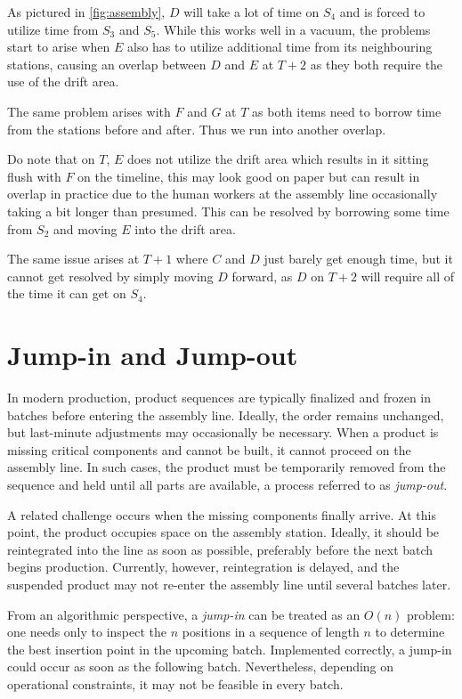 \documentclass[12pt,a4paper]{report}
\begin{document}
As pictured in \autoref{fig:assembly}, $D$ will take a lot of time on $S_4$ and is forced to utilize time from $S_3$ and $S_5$. 
While this works well in a vacuum, the problems start to arise when $E$ also has to utilize additional time from its neighbouring stations, causing an overlap between $D$ and $E$ at $T+2$ as they both require the use of the drift area. 

The same problem arises with $F$ and $G$ at $T$ as both items need to borrow time from the stations before and after. Thus we run into another overlap.

Do note that on $T$, $E$ does not utilize the drift area which results in it sitting flush with $F$ on the timeline, this may look good on paper but can result in overlap in practice due to the human workers at the assembly line occasionally taking a bit longer than presumed. This can be resolved by borrowing some time from $S_2$ and moving $E$ into the drift area. 

The same issue arises at $T+1$ where $C$ and $D$ just barely get enough time, but it cannot get resolved by simply moving $D$ forward, as $D$ on $T+2$ will require all of the time it can get on $S_4$. 

\section{Jump-in and Jump-out}
In modern production, product sequences are typically finalized and frozen in batches before entering the assembly line. Ideally, the order remains unchanged, but last-minute adjustments may occasionally be necessary. When a product is missing critical components and cannot be built, it cannot proceed on the assembly line. In such cases, the product must be temporarily removed from the sequence and held until all parts are available, a process referred to as \emph{jump-out}.

A related challenge occurs when the missing components finally arrive. At this point, the product occupies space on the assembly station. Ideally, it should be reintegrated into the line as soon as possible, preferably before the next batch begins production. Currently, however, reintegration is delayed, and the suspended product may not re-enter the assembly line until several batches later. \cite{ref6}

From an algorithmic perspective, a \emph{jump-in} can be treated as an $O(n)$ problem: one needs only to inspect the $n$ positions in a sequence of length $n$ to determine the best insertion point in the upcoming batch. Implemented correctly, a jump-in could occur as soon as the following batch. Nevertheless, depending on operational constraints, it may not be feasible in every batch.
\end{document}
